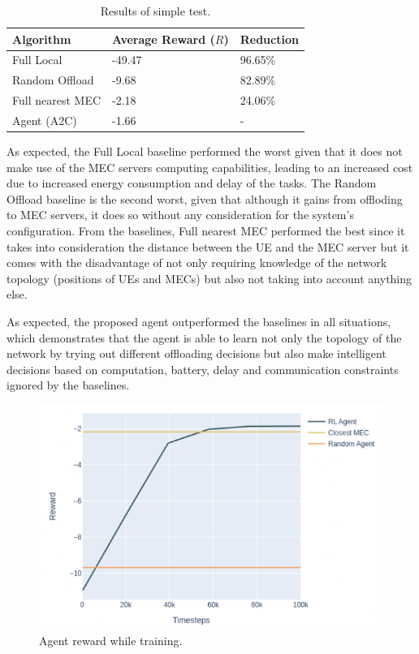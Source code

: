 \documentclass[conference]{IEEEtran}
\begin{document}
\begin{table}[H]
\centering
\begin{tabular}{|l|l|l|}
\hline
Algorithm        & Average Reward ($R$) & Reduction\\ \hline
Full Local       & -49.47 & 96.65\%\\
Random Offload   & -9.68 & 82.89\%\\
Full nearest MEC & -2.18 & 24.06\%\\ 
Agent (A2C) & -1.66 & -\\ \hline
\end{tabular}
\caption{Results of simple test.} \label{resultstest1}
\end{table}

As expected, the Full Local baseline performed the worst given that it does not make use of the \acrshort{MEC} servers computing capabilities, leading to an increased cost due to increased energy consumption and delay of the tasks. The Random Offload baseline is the second worst, given that although it gains from offloding to \acrshort{MEC} servers, it does so without any consideration for the system's configuration. From the baselines, Full nearest MEC performed the best since it takes into consideration the distance between the \acrshort{UE} and the \acrshort{MEC} server but it comes with the disadvantage of not only requiring knowledge of the network topology (positions of \acrshort{UE}s and \acrshort{MEC}s) but also not taking into account anything else. 

As expected, the proposed agent outperformed the baselines in all situations, which demonstrates that the agent is able to learn not only the topology of the network by trying out different offloading decisions but also make intelligent decisions based on computation, battery, delay and communication constraints ignored by the baselines.

\begin{figure}[H]
  \centering
  \includegraphics[width=\linewidth]{images/5_5_training.png}
  \caption{Agent reward while training.}  \label{5_5_training}
\end{figure}
\end{document}
